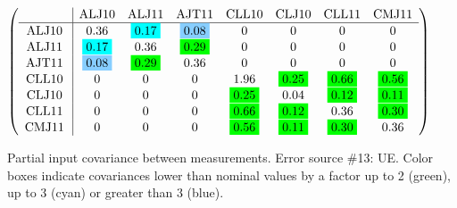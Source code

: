 \begin{table}[H]
\scriptsize
\begin{center}
\renewcommand{\arraystretch}{1.1}
\begin{math}\left(\begin{array}{c|ccccccc}
 & \mathrm{ALJ10} & 
\mathrm{ALJ11} & 
\mathrm{AJT11} & 
\mathrm{CLL10} & 
\mathrm{CLJ10} & 
\mathrm{CLL11} & 
\mathrm{CMJ11} \\
\hline
\mathrm{ALJ10} \hspace*{2pt} &       0.36 &  \colorbox{Cyan1}{$      0.17$} &  \colorbox{SkyBlue1}{$      0.08$} &  0 &  0 &  0 &  0 \\
\mathrm{ALJ11} \hspace*{2pt} &  \colorbox{Cyan1}{$      0.17$} &       0.36 &  \colorbox{Green1}{$      0.29$} &  0 &  0 &  0 &  0 \\
\mathrm{AJT11} \hspace*{2pt} &  \colorbox{SkyBlue1}{$      0.08$} &  \colorbox{Green1}{$      0.29$} &       0.36 &  0 &  0 &  0 &  0 \\
\mathrm{CLL10} \hspace*{2pt} &  0 &  0 &  0 &       1.96 &  \colorbox{Green1}{$      0.25$} &  \colorbox{Green1}{$      0.66$} &  \colorbox{Green1}{$      0.56$} \\
\mathrm{CLJ10} \hspace*{2pt} &  0 &  0 &  0 &  \colorbox{Green1}{$      0.25$} &       0.04 &  \colorbox{Green1}{$      0.12$} &  \colorbox{Green1}{$      0.11$} \\
\mathrm{CLL11} \hspace*{2pt} &  0 &  0 &  0 &  \colorbox{Green1}{$      0.66$} &  \colorbox{Green1}{$      0.12$} &       0.36 &  \colorbox{Green1}{$      0.30$} \\
\mathrm{CMJ11} \hspace*{2pt} &  0 &  0 &  0 &  \colorbox{Green1}{$      0.56$} &  \colorbox{Green1}{$      0.11$} &  \colorbox{Green1}{$      0.30$} &       0.36 \\
\end{array}\right)\end{math}
\caption{Partial input covariance between measurements. Error source \#13: UE. Color boxes indicate covariances lower than nominal values by a factor up to 2 (green), up to 3 (cyan) or greater than 3 (blue).}
\renewcommand{\arraystretch}{1}
\end{center}
\end{table}
